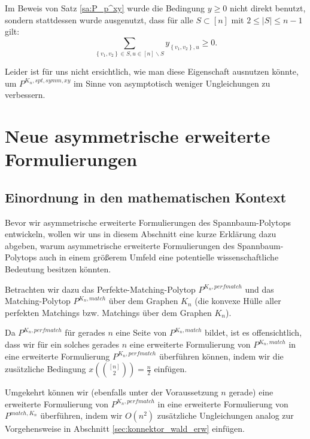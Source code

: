 \documentclass[10p,a4paper,BCOR = 12mm, DIV=15]{scrbook}
\begin{document}
\begin{Bem}
\label{bem:Pxy_noetige_yungleichungen}
Im Beweis von Satz \ref{sa:P_p^xy} wurde die Bedingung $y\geq 0$ nicht direkt benutzt, sondern stattdessen wurde ausgenutzt, dass für alle $S\subset \left[n\right]$ mit $2 \leq \left|S\right| \leq n-1$ gilt:
\begin{displaymath}
\sum_{\left\{v_1, v_2\right\} \in S, u\in \left[n\right] \backslash S} y_{\left\{v_1, v_2\right\}, u} \geq 0.
\end{displaymath}

Leider ist für uns nicht ersichtlich, wie man diese Eigenschaft ausnutzen könnte, um \linebreak $P^{K_n, spt, symm, xy}$ im Sinne von asymptotisch weniger Ungleichungen zu verbessern.
\end{Bem}


\chapter{Neue asymmetrische erweiterte Formulierungen}

\section{Einordnung in den mathematischen Kontext}

Bevor wir asymmetrische erweiterte Formulierungen des Spannbaum-Polytops entwickeln, wollen wir uns in diesem Abschnitt eine kurze Erklärung dazu abgeben, warum asymmetrische erweiterte Formulierungen des Spannbaum-Polytops auch in einem größerem Umfeld eine potentielle wissenschaftliche Bedeutung besitzen könnten.

Betrachten wir dazu das Perfekte-Matching-Polytop $P^{K_n, perfmatch}$ und das Mat\-ching-Polytop $P^{K_n, match}$ über dem Graphen $K_n$ (die konvexe Hülle aller perfekten Matchings bzw. Matchings über dem Graphen $K_n$).

Da $P^{K_n, perfmatch}$ für gerades $n$ eine Seite von $P^{K_n, match}$ bildet, ist es offensichtlich, dass wir für ein solches gerades $n$  eine erweiterte Formulierung von $P^{K_n, match}$ in eine erweiterte Formulierung $P^{K_n, perfmatch}$ überführen können, indem wir die zusätzliche Bedingung $x\left({\left[n\right] \choose 2}\right) = \frac{n}{2}$ einfügen.

Umgekehrt können wir (ebenfalls unter der Voraussetzung $n$ gerade) eine erweiterte Formulierung von $P^{K_n, perfmatch}$ in eine erweiterte Formulierung von $P^{match, K_n}$ überführen, indem wir $O\left(n^2\right)$ zusätzliche Ungleichungen analog zur Vorgehensweise in Abschnitt \ref{sec:konnektor_wald_erw} einfügen.
\end{document}
